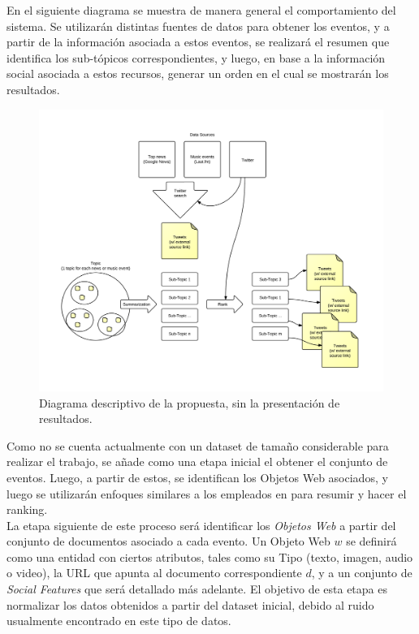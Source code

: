 \documentclass[11pt]{article}
\begin{document}
  En el siguiente diagrama se muestra de manera general el
  comportamiento del sistema. Se utilizarán distintas fuentes de datos
  para obtener los eventos, y a partir de la información asociada a
  estos eventos, se realizará el resumen que identifica los
  sub-tópicos correspondientes, y luego, en base a la información
  social asociada a estos recursos, generar un orden en el cual se
  mostrarán los resultados.

   \begin{figure}[htb]
\centering
\includegraphics[width=15cm]{./img/general.png}
\caption{Diagrama descriptivo de la propuesta, sin la presentación de resultados.}
\end{figure}

   Como no se cuenta actualmente con un dataset de tamaño considerable para realizar el trabajo, se añade como una etapa inicial el obtener el conjunto de eventos. Luego, a partir de estos, se identifican los Objetos Web asociados, y luego se utilizarán enfoques similares a los empleados en \cite{events,clusterers} para resumir y hacer el ranking.\\

   La etapa siguiente de este proceso será identificar los \emph{Objetos Web} a partir del conjunto de documentos asociado a cada evento. Un Objeto Web $w$ se definirá como una entidad con ciertos atributos, tales como su Tipo (texto, imagen, audio o video), la URL que apunta al documento correspondiente $d$, y a un conjunto de \emph{Social Features} que será detallado más adelante. El objetivo de esta etapa es normalizar los datos obtenidos a partir del dataset inicial, debido al ruido usualmente encontrado en este tipo de datos.\\
\end{document}
